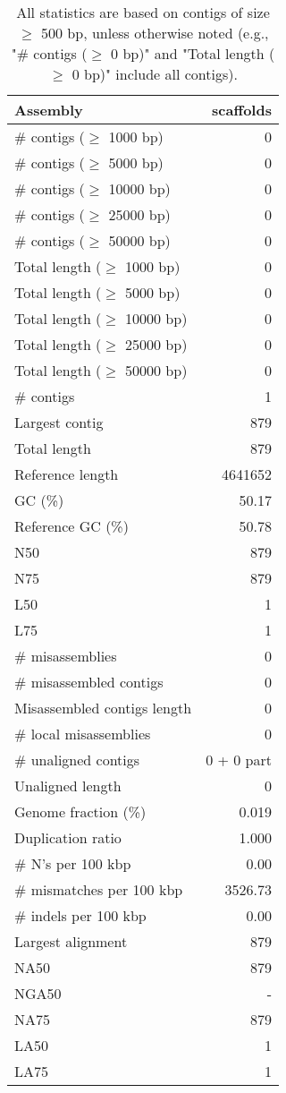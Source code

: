 \documentclass[12pt,a4paper]{article}
\begin{document}
\begin{table}[ht]
\begin{center}
\caption{All statistics are based on contigs of size $\geq$ 500 bp, unless otherwise noted (e.g., "\# contigs ($\geq$ 0 bp)" and "Total length ($\geq$ 0 bp)" include all contigs).}
\begin{tabular}{|l*{1}{|r}|}
\hline
Assembly & scaffolds \\ \hline
\# contigs ($\geq$ 1000 bp) & 0 \\ \hline
\# contigs ($\geq$ 5000 bp) & 0 \\ \hline
\# contigs ($\geq$ 10000 bp) & 0 \\ \hline
\# contigs ($\geq$ 25000 bp) & 0 \\ \hline
\# contigs ($\geq$ 50000 bp) & 0 \\ \hline
Total length ($\geq$ 1000 bp) & 0 \\ \hline
Total length ($\geq$ 5000 bp) & 0 \\ \hline
Total length ($\geq$ 10000 bp) & 0 \\ \hline
Total length ($\geq$ 25000 bp) & 0 \\ \hline
Total length ($\geq$ 50000 bp) & 0 \\ \hline
\# contigs & 1 \\ \hline
Largest contig & 879 \\ \hline
Total length & 879 \\ \hline
Reference length & 4641652 \\ \hline
GC (\%) & 50.17 \\ \hline
Reference GC (\%) & 50.78 \\ \hline
N50 & 879 \\ \hline
N75 & 879 \\ \hline
L50 & 1 \\ \hline
L75 & 1 \\ \hline
\# misassemblies & 0 \\ \hline
\# misassembled contigs & 0 \\ \hline
Misassembled contigs length & 0 \\ \hline
\# local misassemblies & 0 \\ \hline
\# unaligned contigs & 0 + 0 part \\ \hline
Unaligned length & 0 \\ \hline
Genome fraction (\%) & 0.019 \\ \hline
Duplication ratio & 1.000 \\ \hline
\# N's per 100 kbp & 0.00 \\ \hline
\# mismatches per 100 kbp & 3526.73 \\ \hline
\# indels per 100 kbp & 0.00 \\ \hline
Largest alignment & 879 \\ \hline
NA50 & 879 \\ \hline
NGA50 & - \\ \hline
NA75 & 879 \\ \hline
LA50 & 1 \\ \hline
LA75 & 1 \\ \hline
\end{tabular}
\end{center}
\end{table}
\end{document}

